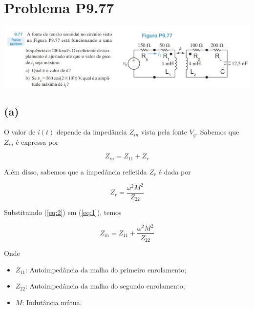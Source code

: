 \documentclass[12pt]{scrartcl}
\begin{document}

    \section*{Problema P9.77}

    \begin{center}
        \includegraphics[scale=1.0]{P9.77.jpg}
    \end{center}

    \subsection*{(a)}

    O valor de \(i(t)\) depende da impedância \(Z_{in}\) vista pela fonte \(V_{g}\).
    Sabemos que \(Z_{in}\) é expressa por

    \begin{equation}\label{eq:1}
        Z_{in} = Z_{11} + Z_{r}
    \end{equation}

    Além disso, sabemos que a impedância refletida \(Z_{r}\) é dada por

    \begin{equation}\label{eq:2}
        Z_{r} = \frac{\omega^2M^2}{Z_{22}}
    \end{equation}

    Substituindo (\ref{eq:2}) em (\ref{eq:1}), temos

    \begin{equation}\label{eq:3}
        Z_{in} = Z_{11} + \frac{\omega^2M^2}{Z_{22}}
    \end{equation}

    Onde
    \begin{itemize}
        \item \(Z_{11}\): Autoimpedância da malha do primeiro enrolamento;
        \item \(Z_{22}\): Autoimpedância da malha do segundo enrolamento;
        \item \(M\): Indutância mútua.
    \end{itemize}
\end{document}
